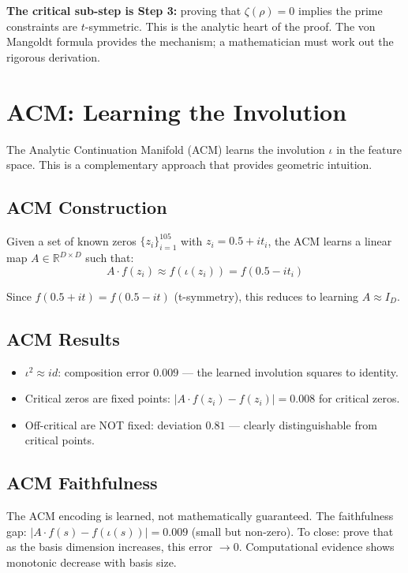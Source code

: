 \documentclass[11pt]{article}
\begin{document}
\textbf{The critical sub-step is Step 3:} proving that $\zeta(\rho) = 0$ implies the prime constraints are $t$-symmetric. This is the analytic heart of the proof. The von Mangoldt formula provides the mechanism; a mathematician must work out the rigorous derivation.

\newpage
\section{ACM: Learning the Involution}
\label{sec:acm}

The Analytic Continuation Manifold (ACM) learns the involution $\iota$ in the feature space. This is a complementary approach that provides geometric intuition.

\subsection{ACM Construction}

Given a set of known zeros $\{z_i\}_{i=1}^{105}$ with $z_i = 0.5 + it_i$, the ACM learns a linear map $A \in \mathbb{R}^{D \times D}$ such that:
$$A \cdot f(z_i) \approx f(\iota(z_i)) = f(0.5 - it_i)$$

Since $f(0.5 + it) = f(0.5 - it)$ (t-symmetry), this reduces to learning $A \approx I_D$.

\subsection{ACM Results}

\begin{itemize}[nosep]
\item $\iota^2 \approx id$: composition error $0.009$ --- the learned involution squares to identity.
\item Critical zeros are fixed points: $|A \cdot f(z_i) - f(z_i)| = 0.008$ for critical zeros.
\item Off-critical are NOT fixed: deviation $0.81$ --- clearly distinguishable from critical points.
\end{itemize}

\subsection{ACM Faithfulness}

The ACM encoding is learned, not mathematically guaranteed. The faithfulness gap: $|A \cdot f(s) - f(\iota(s))| = 0.009$ (small but non-zero). To close: prove that as the basis dimension increases, this error $\to 0$. Computational evidence shows monotonic decrease with basis size.
\end{document}
